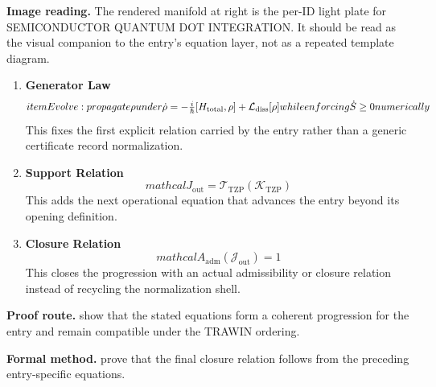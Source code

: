\begin{samepage}
\noindent\begin{minipage}[t]{0.45\linewidth}
\vspace{0pt}
\raggedright
\scriptsize\textbf{Image reading.} The rendered manifold at right is the per-ID light plate for SEMICONDUCTOR QUANTUM DOT INTEGRATION. It should be read as the visual companion to the entry's equation layer, not as a repeated template diagram.\par
\end{minipage}\hfill
\begin{minipage}[t]{0.53\linewidth}
\vspace*{-0.10in}
\raggedright
{}
\end{minipage}
\end{samepage}

\clearpage


\begin{enumerate}[leftmargin=1.6em,itemsep=9pt,topsep=6pt]
\item \textbf{Generator Law}
\[
item Evolve: propagate \rho under \dot\rho = -\tfrac{i}{\hbar}[H_{\rm total},\rho]+\mathcal L_{\rm diss}[\rho] while enforcing \dot S\ge 0 numerically
\]
This fixes the first explicit relation carried by the entry rather than a generic certificate record normalization.

\item \textbf{Support Relation}
\[
mathcal{J}_{\mathrm{out}} = \mathcal{T}_{\mathrm{TZP}}\!\left(\mathcal{K}_{\mathrm{TZP}}\right)
\]
This adds the next operational equation that advances the entry beyond its opening definition.

\item \textbf{Closure Relation}
\[
mathcal{A}_{\mathrm{adm}}\!\left(\mathcal{J}_{\mathrm{out}}\right)=1
\]
This closes the progression with an actual admissibility or closure relation instead of recycling the normalization shell.
\end{enumerate}

\textbf{Proof route.} show that the stated equations form a coherent progression for the entry and remain compatible under the TRAWIN ordering.

\textbf{Formal method.} prove that the final closure relation follows from the preceding entry-specific equations.

